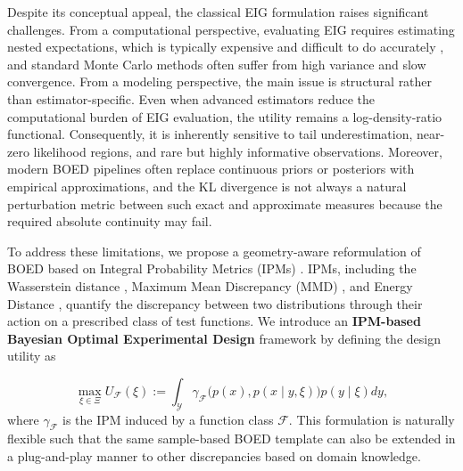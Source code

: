 \documentclass[twoside,11pt]{article}
\begin{document}
Despite its conceptual appeal, the classical EIG formulation raises significant challenges. From a computational perspective, evaluating EIG requires estimating nested expectations, which is typically expensive and difficult to do accurately \citep{rainforth2018nesting}, and standard Monte Carlo methods often suffer from high variance and slow convergence. From a modeling perspective, the main issue is structural rather than estimator-specific. Even when advanced estimators \citep{foster2019variational} reduce the computational burden of EIG evaluation, the utility remains a log-density-ratio functional. Consequently, it is inherently sensitive to tail underestimation, near-zero likelihood regions, and rare but highly informative observations. Moreover, modern BOED pipelines often replace continuous priors or posteriors with empirical approximations, and the KL divergence is not always a natural perturbation metric between such exact and approximate measures because the required absolute continuity may fail.

To address these limitations, we propose a geometry-aware reformulation of BOED based on Integral Probability Metrics (IPMs) \citep{muller1997integral}. IPMs, including the Wasserstein distance \citep{dudley2018real}, Maximum Mean Discrepancy (MMD) \citep{gretton2009fast,berlinet2011reproducing,gretton2012kernel}, and Energy Distance \citep{szekely2004testing,szekely2005new}, quantify the discrepancy between two distributions through their action on a prescribed class of test functions. We introduce an \textbf{IPM-based Bayesian Optimal Experimental Design} framework by defining the design utility as

\begin{equation*}
    \max_{\xi \in \Xi} U_{\mathcal{F}}(\xi) := \int_{\mathcal{Y}} \gamma_{\mathcal{F}}\big(p(x), p(x \mid y, \xi)\big) p(y \mid \xi) dy,
\end{equation*}
where $\gamma_{\mathcal{F}}$ is the IPM induced by a function class $\mathcal{F}$. This formulation is naturally flexible such that the same sample-based BOED template can also be extended in a plug-and-play manner to other discrepancies based on domain knowledge.
\end{document}
